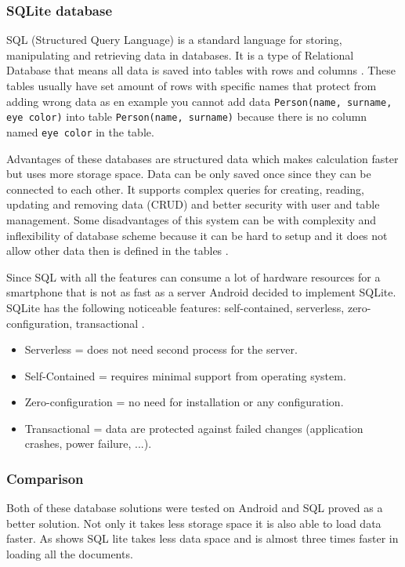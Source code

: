 \subsubsection{SQLite database}\label{subsec:SQLiteDatabase}
SQL (Structured Query Language) is a standard language for storing, manipulating and retrieving data in databases. It is a type of Relational Database that means all data is saved into tables with rows and columns \cite{ItSQL}. These tables usually have set amount of rows with specific names that protect from adding wrong data as en example you cannot add data \verb|Person(name, surname, eye color)| into table \verb|Person(name, surname)| because there is no column named \verb|eye color| in the table.

Advantages of these databases are structured data which makes calculation faster but uses more storage space. Data can be only saved once since they can be connected to each other. It supports complex queries for creating, reading, updating and removing data (CRUD) and better security with user and table management. Some disadvantages of this system can be with complexity and inflexibility of database scheme because it can be hard to setup and it does not allow other data then is defined in the tables \cite{ERDMS}.

Since SQL with all the features can consume a lot of hardware resources for a smartphone that is not as fast as a server Android decided to implement SQLite. SQLite has the following noticeable features: self-contained, serverless, zero-configuration, transactional \cite{WISQLITE}.

\begin{itemize}
	\item Serverless = does not need second process for the server.
	\item Self-Contained = requires minimal support from operating system.
	\item Zero-configuration = no need for installation or any configuration.
	\item Transactional = data are protected against failed changes (application crashes, power failure, ...).
\end{itemize}

\subsubsection{Comparison}\label{subsec:Comparison}
Both of these database solutions were tested on Android and SQL proved as a better solution. Not only it takes less storage space it is also able to load data faster. As  shows SQL lite takes less data space and is almost three times faster in loading all the documents.

